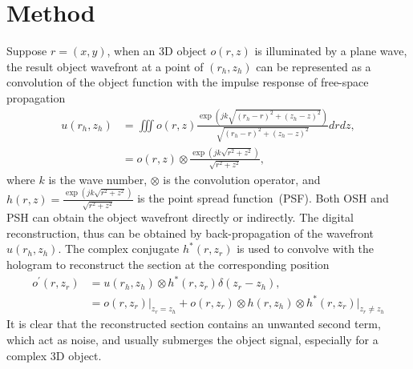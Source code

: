 \documentclass[9pt,twocolumn,twoside]{osajnl}
\begin{document}
\section{Method}\label{sec_method}
Suppose $r=(x,y)$, when an 3D object $o(r,z)$ is illuminated by a plane wave, the result object wavefront at a point of $(r_h, z_h)$ can be represented as a convolution of the object function with the impulse response of free-space propagation~\cite{Goodman2005}
\begin{equation}
\begin{aligned}
u(r_h,z_h) 
& = \iiint o(r,z) \frac{\exp(jk\sqrt{(r_h-r)^2 + (z_h-z)^2})}{\sqrt{(r_h-r)^2 + (z_h-z)^2}} d r dz, \\
& = o(r,z) \otimes \frac{\exp(jk\sqrt{r^2 + z^2})}{\sqrt{r^2 + z^2}},
\label{eq_3ddiffr}
\end{aligned}
\end{equation}
where $k$ is the wave number, $\otimes$ is the convolution operator, and $h(r,z)=\frac{\exp(jk\sqrt{r^2 + z^2})}{\sqrt{r^2 + z^2}}$ is the point spread function~(PSF). 
Both OSH and PSH can obtain the object wavefront directly or indirectly.
The digital reconstruction, thus can be obtained by back-propagation of the  wavefront $u(r_h,z_h)$. The complex conjugate $h^*(r, z_r)$ is used to convolve with the hologram to reconstruct the section at the corresponding position
\begin{equation}
\begin{aligned}
o^\prime(r,z_r) 
& = u(r_h,z_h)\otimes h^*(r,z_r) \delta(z_r-z_h) , \\
& = o(r,z_r)\vert_{z_r=z_h} + o(r,z_r) \otimes h(r, z_h) \otimes h^*(r,z_r) \vert_{z_r \neq z_h}
\label{eq_3ddiffr_inv}
\end{aligned}
\end{equation}
It is clear that the reconstructed section contains an unwanted second term, which act as noise, and usually submerges the object signal, especially for a complex 3D object. 
\end{document}
